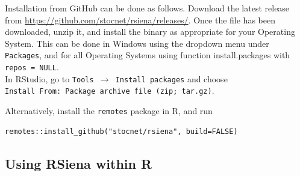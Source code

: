 \documentclass[a4paper,fleqn,11pt]{article}
\newcommand{\+}{\, + \,}
\newcommand{\sfn}[1]{\textsf{#1}}
\newcommand{\R}{{\sf R }}
\newcommand{\Rn}{{\sf R}}
\newcommand{\RS}{{\sf \textsf{RSiena} }}
\begin{document}
\begin{enumerate}

            Installation from GitHub can be done as follows.
        Download  the latest release from
        \url{https://github.com/stocnet/rsiena/releases/}.
Once the file has been downloaded, unzip it, and install the binary
as appropriate for your Operating System.
This can be done in Windows using the dropdown menu under \texttt{Packages},
and for all Operating Systems using function \sfn{install.packages}
with \texttt{repos = NULL}.\\
In \sfn{RStudio}, go to \texttt{Tools  $\rightarrow$ Install packages}
and choose\\ \texttt{Install From: Package archive file (zip; tar.gz)}.

Alternatively, install the \texttt{remotes} package in R,
and run
\begin{verbatim}
remotes::install_github("stocnet/rsiena", build=FALSE)
\end{verbatim}
\end{enumerate}


\subsection{Using \RS within \Rn}
\end{document}
